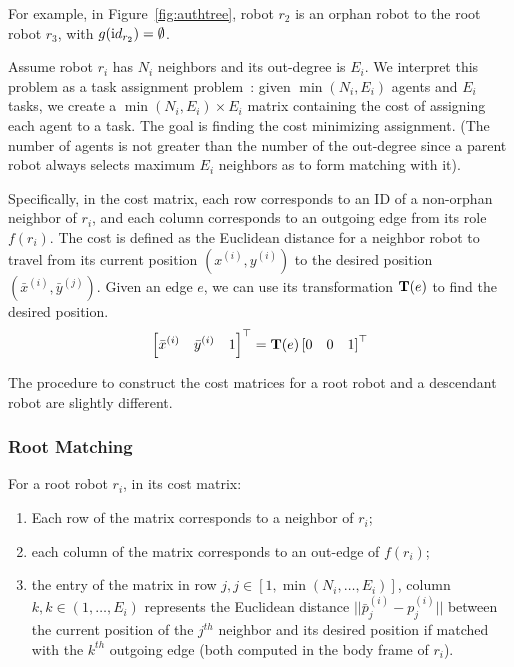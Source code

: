 For example, in Figure~\ref{fig:authtree}, robot $r_2$ is an orphan robot to the root robot $r_3$, with $g({\textrm id}_{r_2}) = \emptyset$.

Assume robot $r_i$ has $N_i$ neighbors and its out-degree is $E_i$. 
%
We interpret this problem as a task assignment problem~\cite{Kuh55, Mun57}: given $\min(N_i, E_i)$ agents and $E_i$ tasks, we create a $\min(N_i, E_i)\times E_i$ matrix containing the cost of assigning each agent to a task. 
%
The goal is finding the cost minimizing assignment. 
%
(The number of agents is not greater than the number of
the out-degree since a parent robot always selects maximum $E_i$ neighbors as to form matching with it).

Specifically, in the cost matrix, each row corresponds to an ID of a non-orphan neighbor of $r_i$, and each column corresponds to an outgoing edge from its role $f(r_i)$. 
%
The cost is defined as the Euclidean distance for a neighbor robot to
travel from its current position $(x^{(i)}, y^{(i)})$ to the desired
position $(\bar{x}^{(i)}, \bar{y}^{(j)})$. 
%
Given an edge $e$, we can use its transformation $\mathbf{T}(e)$ to find the desired position.
\begin{equation}
  \label{eq:trans-pos}
  \left[\bar{x}^{(i)} \quad \bar{y}^{(i)} \quad 1\right]^\top = \mathbf{T}(e) \left[0 \quad 0 \quad 1\right]^\top
\end{equation}

The procedure to construct the cost matrices for a root robot and a descendant robot are slightly different.

\subsubsection{Root Matching}

For a root robot $r_i$, in its cost matrix:
\begin{enumerate}
  \item Each row of the matrix corresponds to a neighbor of $r_i$;
  \item each column of the matrix corresponds to an out-edge of $f(r_i)$;
  \item the entry of the matrix in row $j, j \in [1, \min(N_i,\ldots, E_i)]$, column
    $k, k \in (1,\ldots, E_i)$ represents the Euclidean distance $|| \bar{p}_j^{(i)} -
    {p}_j^{(i)} ||$ between the current position of the $j^{th}$ neighbor and
    its desired position if matched with the $k^{th}$ outgoing edge (both computed in the body frame of $r_i$).  
\end{enumerate}

